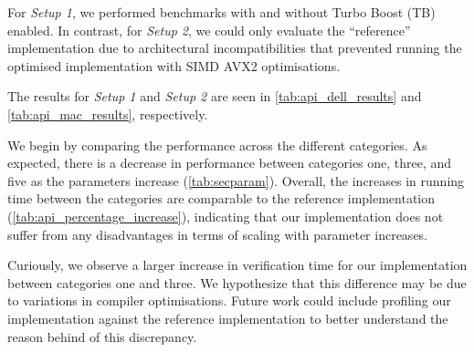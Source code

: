 \documentclass[11pt]{report}
\theoremstyle{definition}
\theoremstyle{plain}
\begin{document}
For \textit{Setup 1}, we performed benchmarks with and without Turbo Boost (TB) enabled. In contrast, for \textit{Setup 2}, we could only evaluate the ``reference'' implementation due to architectural incompatibilities that prevented running the optimised implementation with SIMD AVX2 optimisations.

The results for \textit{Setup 1} and \textit{Setup 2} are seen in \autoref{tab:api_dell_results} and \autoref{tab:api_mac_results}, respectively.

We begin by comparing the performance across the different categories. As expected, there is a decrease in performance between categories one, three, and five as the parameters increase (\autoref{tab:secparam}). Overall, the increases in running time between the categories are comparable to the reference implementation (\autoref{tab:api_percentage_increase}), indicating that our implementation does not suffer from any disadvantages in terms of scaling with parameter increases.

Curiously, we observe a larger increase in verification time for our implementation between categories one and three. We hypothesize that this difference may be due to variations in compiler optimisations. Future work could include profiling our implementation against the reference implementation to better understand the reason behind of this discrepancy.
\end{document}
